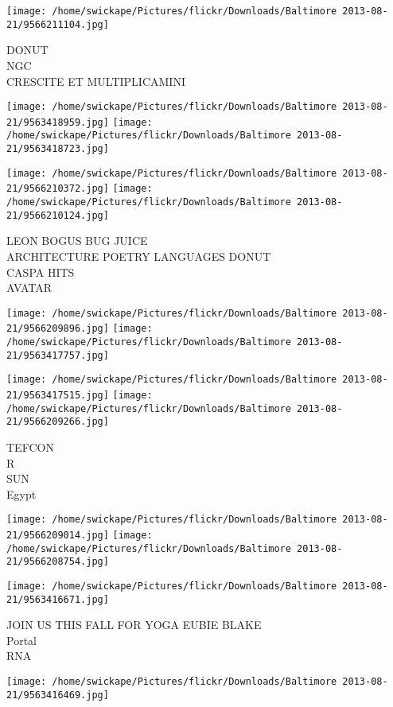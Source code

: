 \documentclass[10pt,letterpaper]{article}
\begin{document}
\vspace{0.25in}
\texttt{[image: /home/swickape/Pictures/flickr/Downloads/Baltimore 2013-08-21/9566211104.jpg]}

DONUT\\
NGC\\
CRESCITE ET MULTIPLICAMINI
\pagebreak

\texttt{[image: /home/swickape/Pictures/flickr/Downloads/Baltimore 2013-08-21/9563418959.jpg]}
\texttt{[image: /home/swickape/Pictures/flickr/Downloads/Baltimore 2013-08-21/9563418723.jpg]}

\texttt{[image: /home/swickape/Pictures/flickr/Downloads/Baltimore 2013-08-21/9566210372.jpg]}
\texttt{[image: /home/swickape/Pictures/flickr/Downloads/Baltimore 2013-08-21/9566210124.jpg]}

LEON BOGUS BUG JUICE\\
ARCHITECTURE POETRY LANGUAGES DONUT\\
CASPA HITS\\
AVATAR
\pagebreak

\texttt{[image: /home/swickape/Pictures/flickr/Downloads/Baltimore 2013-08-21/9566209896.jpg]}
\texttt{[image: /home/swickape/Pictures/flickr/Downloads/Baltimore 2013-08-21/9563417757.jpg]}

\texttt{[image: /home/swickape/Pictures/flickr/Downloads/Baltimore 2013-08-21/9563417515.jpg]}
\texttt{[image: /home/swickape/Pictures/flickr/Downloads/Baltimore 2013-08-21/9566209266.jpg]}

TEFCON\\
R\\
SUN\\
Egypt
\pagebreak

\texttt{[image: /home/swickape/Pictures/flickr/Downloads/Baltimore 2013-08-21/9566209014.jpg]}
\texttt{[image: /home/swickape/Pictures/flickr/Downloads/Baltimore 2013-08-21/9566208754.jpg]}

\texttt{[image: /home/swickape/Pictures/flickr/Downloads/Baltimore 2013-08-21/9563416671.jpg]}

JOIN US THIS FALL FOR YOGA EUBIE BLAKE\\
Portal\\
RNA
\pagebreak

\texttt{[image: /home/swickape/Pictures/flickr/Downloads/Baltimore 2013-08-21/9563416469.jpg]}
\end{document}
